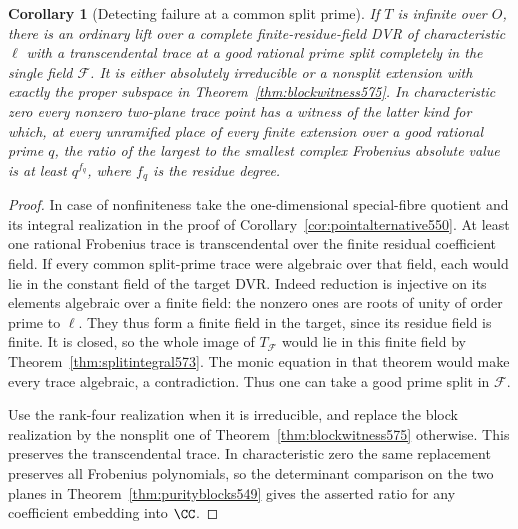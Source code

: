 \documentclass[a4paper,11pt]{article}
\newtheorem{corollary}[proposition]{Corollary}
\theoremstyle{definition}
\theoremstyle{remark}
\numberwithin{equation}{section}
\begin{document}
\begin{corollary}[Detecting failure at a common split prime]
\leavevmode\label{cor:commonwitness575}
If \(T\) is infinite over \(O\), there is an ordinary lift
over a complete finite-residue-field DVR of characteristic
\(\ell\) with a transcendental trace at a good rational
prime split completely in the single field \(\mathcal F\).
It is either absolutely irreducible or a nonsplit extension
with exactly the proper subspace in
Theorem~\ref{thm:blockwitness575}. In characteristic zero
every nonzero two-plane trace point has a witness of the
latter kind for which, at every unramified place of every
finite extension over a good rational prime \(q\), the
ratio of the largest to the smallest complex Frobenius
absolute value is at least \(q^{f_q}\), where \(f_q\) is
the residue degree.
\end{corollary}
\begin{proof}
In case of nonfiniteness take the one-dimensional
special-fibre quotient and its integral realization in
the proof of Corollary~\ref{cor:pointalternative550}.
At least one rational Frobenius trace is transcendental
over the finite residual coefficient field. If every
common split-prime trace were algebraic over that field,
each would lie in the constant field of the target DVR.
Indeed reduction is injective on its elements algebraic
over a finite field: the nonzero ones are roots of unity
of order prime to \(\ell\). They thus form a finite field
in the target, since its residue field is finite. It is
closed, so the whole image of \(T_{\mathcal F}\) would
lie in this finite field by Theorem~\ref{thm:splitintegral573}.
The monic equation in that theorem would make every trace
algebraic, a contradiction. Thus one can take a good
prime split in \(\mathcal F\).

Use the rank-four realization when it is irreducible,
and replace the block realization by the nonsplit one
of Theorem~\ref{thm:blockwitness575} otherwise. This
preserves the transcendental trace. In characteristic
zero the same replacement preserves all Frobenius
polynomials, so the determinant comparison on the two
planes in Theorem~\ref{thm:purityblocks549} gives the
asserted ratio for any coefficient embedding into
\(\CC\).
\end{proof}
\end{document}
